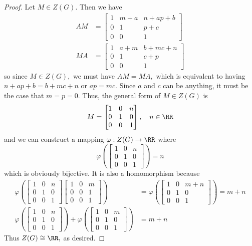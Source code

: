 \documentclass{article}
\begin{document}
\begin{itemize}
\begin{enumerate}[(a)]
\begin{proof}
				Let $M\in Z(G).$ Then we have 
				\begin{align*}
					AM &= \begin{bmatrix}
						1 & m+a & n+ap+b \\
						0 & 1 & p+c \\
						0 & 0 & 1 
					\end{bmatrix} \\
					MA &= \begin{bmatrix}
						1 & a+m & b+mc+n \\
						0 & 1 & c+p \\
						0 & 0 & 1
					\end{bmatrix}
				\end{align*} so since $M\in Z(G),$ we must have $AM=MA,$ which is equivalent to having $n+ap+b=b+mc+n$ or $ap=mc.$ Since $a$ and $c$ can be anything, it must be the case that $m=p=0.$ Thus, the general form of $M\in Z(G)$ is \[M=\begin{bmatrix}
						1 & 0 & n \\ 0 & 1 & 0 \\ 0 & 0 & 1
					\end{bmatrix}, \quad n\in \RR
			\] and we can construct a mapping $\varphi:Z(G)\to\RR$ where \[\varphi\left( \begin{bmatrix}
					1 & 0 & n \\ 0 & 1 & 0 \\ 0 & 0 & 1
			\end{bmatrix}\right) = n\] which is obviously bijective. It is also a homomorphism because 
			\begin{align*}
				\varphi\left( \begin{bmatrix}
					1 & 0 & n \\ 0 & 1 & 0 \\ 0 & 0 & 1
				\end{bmatrix}\begin{bmatrix}
					1 & 0 & m \\ 0 & 0 & 1 \\ 0 & 0 & 1
				\end{bmatrix}\right) &= \varphi\left( \begin{bmatrix}
					1 & 0 & m+n \\ 0 & 1 & 0 \\ 0 & 0 & 1
				\end{bmatrix}\right) = m+n \\
				\varphi\left( \begin{bmatrix}
					1 & 0 & n \\ 0 & 1 & 0 \\ 0 & 0 & 1
				\end{bmatrix}\right)+\varphi\left( \begin{bmatrix}
					1 & 0 & m \\ 0 & 1 & 0 \\ 0 & 0 & 1
				\end{bmatrix}\right) &= m+n
			\end{align*}
			Thus $Z(G)\cong \RR,$ as desired.


\end{proof}
\end{enumerate}
\end{itemize}
\end{document}
